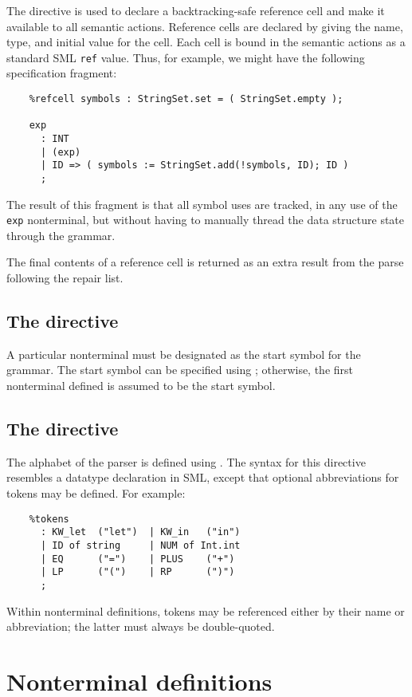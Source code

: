 The  directive is used to declare a backtracking-safe reference cell and make it available to all semantic actions.  Reference cells are declared by giving the name, type, and initial value for the cell.  Each cell is bound in the semantic actions as a standard SML \texttt{ref} value.  Thus, for example, we might have the following specification fragment:
\begin{verbatim}
    %refcell symbols : StringSet.set = ( StringSet.empty );
    
    exp
      : INT
      | (exp)
      | ID => ( symbols := StringSet.add(!symbols, ID); ID )
      ;
\end{verbatim}
The result of this fragment is that all symbol uses are tracked, in any use of
the \texttt{exp} nonterminal, but without having to manually thread the data
structure state through the grammar.

The final contents of a reference cell is returned as an extra result from the parse
following the repair list.

\subsection{The  directive}\label{sec:start}

A particular nonterminal must be designated as the start symbol for the grammar.  The start symbol can be specified using ; otherwise, the first nonterminal defined is assumed to be the start symbol.

\subsection{The  directive}

The alphabet of the parser is defined using .  The syntax for this directive resembles a datatype declaration in SML, except that optional abbreviations for tokens may be defined.  For example:
\begin{verbatim}
    %tokens
      : KW_let  ("let")  | KW_in   ("in")
      | ID of string     | NUM of Int.int
      | EQ      ("=")    | PLUS    ("+")
      | LP      ("(")    | RP      (")")
      ;
\end{verbatim}
Within nonterminal definitions, tokens may be referenced either by their name or abbreviation; the latter must always be double-quoted.

\section{Nonterminal definitions}\label{sec:antlr-nt}

